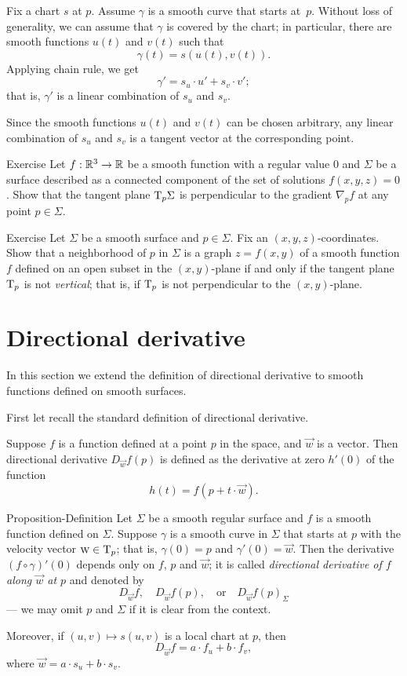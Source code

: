 Fix a chart $s$ at $p$.
Assume $\gamma$ is a smooth curve that starts at~$p$.
Without loss of generality, we can assume that $\gamma$ is covered by the chart;
in particular, there are smooth functions $u(t)$ and $v(t)$ such that 
\[\gamma(t)=s(u(t),v(t)).\]
Applying chain rule, we get
\[\gamma'=s_u\cdot u'+ s_v\cdot v';\]
that is, $\gamma'$ is a linear combination of $s_u$ and $s_v$.

Since the smooth functions $u(t)$ and $v(t)$ can be chosen arbitrary, any linear combination of $s_u$ and $s_v$ is a tangent vector at the corresponding point. 
\qeds


\begin{thm}{Exercise}\label{ex:tangent-normal}
Let $f:\mathbb{R}^3\to\mathbb{R}$ be a smooth function with a regular value $0$ and $\Sigma$ be a surface described as a connected component of the set of solutions $f(x,y,z)=0$.
Show that the tangent plane $\mathrm{T}_p\Sigma$ is perpendicular to the gradient $\nabla_pf$ at any point $p\in\Sigma$.
\end{thm}

\begin{thm}{Exercise}\label{ex:vertical-tangent}
Let $\Sigma$ be a smooth surface and $p\in\Sigma$.
Fix an $(x,y,z)$-coordinates.
Show that a neighborhood of $p$ in $\Sigma$ is a graph $z=f(x,y)$ of a smooth function $f$ defined on an open subset in the $(x,y)$-plane if and only if the tangent plane $\mathrm{T}_p$ is not \emph{vertical}; that is, if $\mathrm{T}_p$ is not perpendicular to the $(x,y)$-plane.
\end{thm}


\section{Directional derivative}

In this section we extend the definition of directional derivative to smooth functions defined on smooth surfaces.

First let recall the standard definition of directional derivative.

Suppose $f$ is a function defined at a point $p$ in the space, and $\vec w$ is a vector.
Then directional derivative $D_{\vec w}f(p)$ is defined as the derivative at zero $h'(0)$ of the function
\[h(t)=f(p+t\cdot\vec w).\]

\begin{thm}{Proposition-Definition}\label{def:directional-derivative}
Let $\Sigma$ be a smooth regular surface and $f$ is a smooth function defined on $\Sigma$. 
Suppose $\gamma$ is a smooth curve in $\Sigma$ that starts at $p$ with the velocity vector $\textsc{w}\in \mathrm{T}_p$;
that is, $\gamma(0)=p$ and $\gamma'(0)=\vec{w}$.
Then the derivative $(f\circ\gamma)'(0)$
depends only on $f$, $p$ and $\vec{w}$;
it is called \emph{directional derivative of $f$ along $\vec{w}$ at $p$}
and denoted by
\[D_{\vec{w}}f,\quad D_{\vec{w}}f(p), \quad\text{or}\quad D_{\vec{w}}f(p)_\Sigma\] 
--- we may omit $p$ and $\Sigma$ if it is clear from the context.

Moreover, if $(u,v)\mapsto s(u,v)$ is a local chart at $p$, then 
\[D_{\vec{w}}f=a\cdot f_u+b\cdot f_v,\]
where $\vec{w}=a\cdot s_u +b\cdot s_v$. 
\end{thm}

